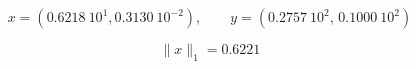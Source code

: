 \[ x=(0.6218\ 10^1, 0.3130\ 10^{-2}), \quad \quad  y=(0.2757\ 10^2, \, 0.1000\ 10^{2}) \]

\medskip
\[ \|x\|_1= 0.6221 \]
